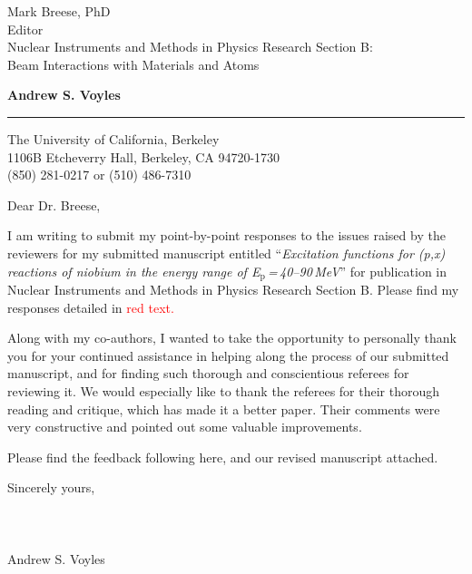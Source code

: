 \documentclass{letter} %
\newcommand{\colornote}[1]{\textcolor{red}{#1}}
\begin{document}
\signature{Andrew S. Voyles}           %
\longindentation=0pt                       %
\let\raggedleft\raggedright                %
 
 
\begin{letter}{Mark Breese, PhD \\
Editor \\
Nuclear Instruments and Methods in Physics Research Section B: \\
Beam Interactions with Materials and Atoms}


\begin{flushleft}
{\large\bf Andrew S. Voyles}
\end{flushleft}
\medskip\hrule height 1pt
\begin{flushright}
\hfill The University of California, Berkeley \\
\hfill 1106B Etcheverry Hall, Berkeley, CA  94720-1730 \\
\hfill (850) 281-0217 or (510) 486-7310 
\end{flushright} 
\vfill %

 
\opening{Dear Dr. Breese,} 

  \renewcommand*{\thefootnote}{\alph{footnote}}

  \noindent I am writing to submit my point-by-point responses to the issues raised by the reviewers for my submitted manuscript entitled \enquote{\emph{Excitation functions for (p,x) reactions of niobium in the energy range of E\texorpdfstring{$_{\text{p}}$\,=\,40--90\,}{Ep = 40--90 }MeV}}  for publication in Nuclear Instruments and Methods in Physics Research Section B.  Please find my responses detailed in \colornote{red text.}
  
  \noindent Along with my co-authors, I wanted to take the opportunity to personally thank you for your continued assistance in helping along the process of our submitted manuscript, and for finding such thorough and conscientious referees for reviewing it.  We would especially like to thank the referees for their thorough reading and critique, which has made it a better paper. Their comments were very constructive and pointed out some valuable improvements.
  
  Please find the feedback following here, and our revised manuscript attached. 
  
  Sincerely yours,\\ \\ \\ \\ Andrew S. Voyles
 

\end{letter}
\end{document}
